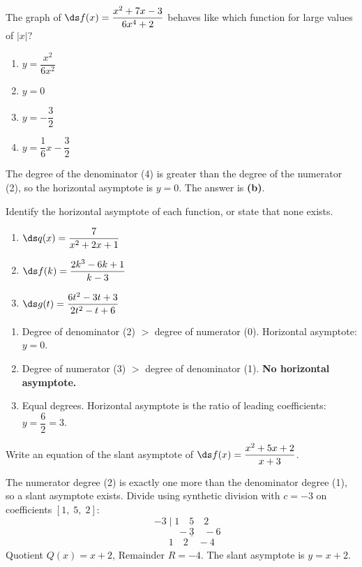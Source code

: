 \documentclass{ximera}
\begin{document}
\begin{problem}
The graph of $\ds f(x) = \dfrac{x^2+7x-3}{6x^4+2}$ behaves like which function for large values of $|x|$?
\begin{enumerate}
  \item[(a)] $y = \dfrac{x^2}{6x^2}$
  \item[(b)] $y = 0$
  \item[(c)] $y = -\dfrac{3}{2}$
  \item[(d)] $y = \dfrac{1}{6}x - \dfrac{3}{2}$
\end{enumerate}

\begin{solution}
The degree of the denominator (4) is greater than the degree of the numerator (2), so the horizontal asymptote is $y=0$. The answer is \textbf{(b)}.
\end{solution}
\end{problem}


\begin{problem}
Identify the horizontal asymptote of each function, or state that none exists.
\begin{enumerate}
  \item[(a)] $\ds q(x) = \dfrac{7}{x^2+2x+1}$
  \medskip
  \item[(b)] $\ds f(k) = \dfrac{2k^3-6k+1}{k-3}$
  \medskip
  \item[(c)] $\ds g(t) = \dfrac{6t^2-3t+3}{2t^2-t+6}$
\end{enumerate}

\begin{solution}
\begin{enumerate}
  \item[(a)] Degree of denominator (2) $>$ degree of numerator (0). Horizontal asymptote: $y=0$.

  \item[(b)] Degree of numerator (3) $>$ degree of denominator (1). \textbf{No horizontal asymptote.}

  \item[(c)] Equal degrees. Horizontal asymptote is the ratio of leading coefficients: $y = \dfrac{6}{2} = 3$.
\end{enumerate}
\end{solution}
\end{problem}


\begin{problem}
Write an equation of the slant asymptote of $\ds f(x) = \dfrac{x^2+5x+2}{x+3}$.

\begin{solution}
The numerator degree (2) is exactly one more than the denominator degree (1), so a slant asymptote exists. Divide using synthetic division with $c=-3$ on coefficients $[1,\;5,\;2]$:
$$-3 \mid 1 \quad 5 \quad 2$$
$$\phantom{-3\mid}\underline{\phantom{1}\quad -3 \quad -6}$$
$$\phantom{-3\mid}1 \quad 2 \quad -4$$
Quotient $Q(x) = x+2$, Remainder $R = -4$. The slant asymptote is $y = x+2$.
\end{solution}
\end{problem}
\end{document}
